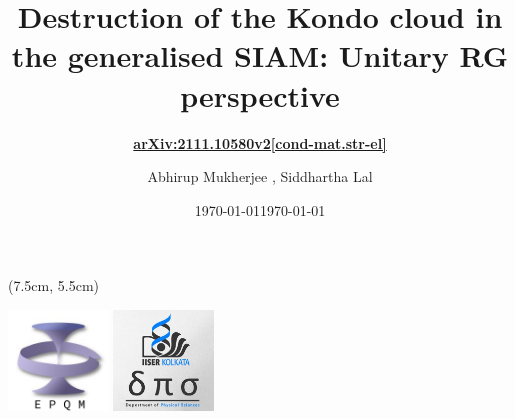 \documentclass[aspectratio=169]{beamer}
\title{
\LARGE{Destruction of the Kondo cloud in the generalised SIAM: Unitary RG perspective
}
}
\subtitle{\bf\large\color{lyellow}\href{https://arxiv.org/abs/2111.10580}{arXiv:2111.10580v2[cond-mat.str-el]}}
\date{\today}
\author{\large Abhirup Mukherjee \inst{1}, Siddhartha Lal \inst{1}}
\institute{\small\inst{1} Department of Physical Sciences,IISER Kolkata}
\date{\large\today}
\begin{document}
\begin{frame}[noframenumbering]
\maketitle
\begin{textblock*}{0.7\textwidth}(7.5cm, 5.5cm)
	\centering
	\vspace*{\fill}

	\hspace*{\fill}
	\includegraphics[width=0.2\textwidth]{figures/epqm_logo_mod.jpeg}
	\includegraphics[width=0.2\textwidth]{figures/dps_logo.jpeg}
	\hspace*{\fill}

	\vspace*{\fill}
\end{textblock*}
\end{frame}
\end{document}
